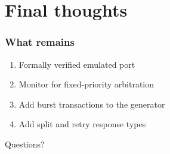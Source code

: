 \documentclass[]{beamer}
\begin{document}
\section{Final thoughts}

\begin{frame}
 \frametitle{What remains}
 \begin{enumerate}
  \item<1-> Formally verified emulated port
  \item<2-> Monitor for fixed-priority arbitration
  \item<3-> Add burst transactions to the generator
  \item<4-> Add split and retry response types
 \end{enumerate}
\end{frame}

\begin{frame}
 Questions?
\end{frame}
\end{document}
